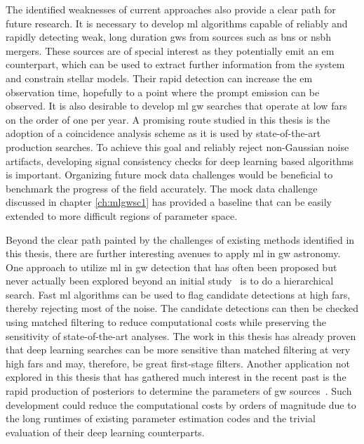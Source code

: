 The identified weaknesses of current approaches also provide a clear path for future research. It is necessary to develop \acrshort{ml} algorithms capable of reliably and rapidly detecting weak, long duration \acrshort{gw}s from sources such as \acrshort{bns} or \acrshort{nsbh} mergers. These sources are of special interest as they potentially emit an \acrshort{em} counterpart, which can be used to extract further information from the system and constrain stellar models. Their rapid detection can increase the \acrshort{em} observation time, hopefully to a point where the prompt emission can be observed. It is also desirable to develop \acrshort{ml} \acrshort{gw} searches that operate at low \acrshort{far}s on the order of one per year. A promising route studied in this thesis is the adoption of a coincidence analysis scheme as it is used by state-of-the-art production searches. To achieve this goal and reliably reject non-Gaussian noise artifacts, developing signal consistency checks for deep learning based algorithms is important. Organizing future mock data challenges would be beneficial to benchmark the progress of the field accurately. The mock data challenge discussed in chapter \ref{ch:mlgwsc1} has provided a baseline that can be easily extended to more difficult regions of parameter space.

Beyond the clear path painted by the challenges of existing methods identified in this thesis, there are further interesting avenues to apply \acrshort{ml} in \acrshort{gw} astronomy. One approach to utilize \acrshort{ml} in \acrshort{gw} detection that has often been proposed but never actually been explored beyond an initial study~\cite{Verma:2021epx} is to do a hierarchical search. Fast \acrshort{ml} algorithms can be used to flag candidate detections at high \acrshort{far}s, thereby rejecting most of the noise. The candidate detections can then be checked using matched filtering to reduce computational costs while preserving the sensitivity of state-of-the-art analyses. The work in this thesis has already proven that deep learning searches can be more sensitive than matched filtering at very high \acrshort{far}s and may, therefore, be great first-stage filters. Another application not explored in this thesis that has gathered much interest in the recent past is the rapid production of posteriors to determine the parameters of \acrshort{gw} sources~\cite{Gabbard:2019rde, Dax:2021tsq}. Such development could reduce the computational costs by orders of magnitude due to the long runtimes of existing parameter estimation codes and the trivial evaluation of their deep learning counterparts.

